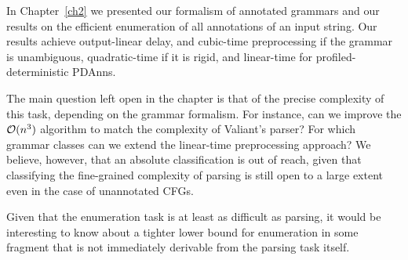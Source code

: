 In Chapter~\ref{ch2} we presented our formalism of annotated grammars and our results on the efficient enumeration of all annotations of an input string. 
Our results achieve output-linear delay, and cubic-time preprocessing if the grammar is unambiguous, quadratic-time if it is rigid, and linear-time for profiled-deterministic PDAnns.

The main question left open in the chapter is that of the precise complexity of
this task, depending on the grammar formalism. For instance, can we improve the 
$\mathcal{O}(n^3)$ algorithm to match the complexity of Valiant's parser? For which grammar
classes can we extend the linear-time preprocessing approach? We believe,
however, that an absolute classification is out of reach, given that classifying
the fine-grained complexity of parsing is still open to a large extent even in
the case of unannotated CFGs. 

Given that the enumeration task is at least as difficult as parsing, it would be interesting to know about a tighter lower bound for enumeration in some fragment that is not immediately derivable from the parsing task itself.